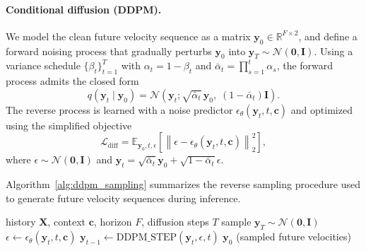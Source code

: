 \paragraph{Conditional diffusion (DDPM).}
We model the clean future velocity sequence as a matrix $\mathbf{y}_0 \in \mathbb{R}^{F\times 2}$, and define a forward noising process that gradually perturbs $\mathbf{y}_0$ into $\mathbf{y}_T \sim \mathcal{N}(\mathbf{0}, \mathbf{I})$.
Using a variance schedule $\{\beta_t\}_{t=1}^T$ with $\alpha_t=1-\beta_t$ and $\bar{\alpha}_t=\prod_{s=1}^t \alpha_s$, the forward process admits the closed form
\begin{equation}
  q(\mathbf{y}_t \mid \mathbf{y}_0)=\mathcal{N}\!\left(\mathbf{y}_t; \sqrt{\bar{\alpha}_t}\,\mathbf{y}_0,\; (1-\bar{\alpha}_t)\mathbf{I}\right).
  \label{eq:ddpm_forward}
\end{equation}
The reverse process is learned with a noise predictor $\epsilon_\theta(\mathbf{y}_t,t,\mathbf{c})$ and optimized using the simplified objective
\begin{equation}
  \mathcal{L}_{\mathrm{diff}} =
  \mathbb{E}_{\mathbf{y}_0,t,\epsilon}\left[\left\|\epsilon - \epsilon_\theta(\mathbf{y}_t,t,\mathbf{c})\right\|_2^2\right],
  \label{eq:ddpm_loss}
\end{equation}
where $\epsilon \sim \mathcal{N}(\mathbf{0},\mathbf{I})$ and $\mathbf{y}_t=\sqrt{\bar{\alpha}_t}\mathbf{y}_0+\sqrt{1-\bar{\alpha}_t}\epsilon$.

Algorithm~\ref{alg:ddpm_sampling} summarizes the reverse sampling procedure used to generate future velocity sequences during inference.

\begin{algorithm}[t]
  \caption{Reverse diffusion sampling (future velocities)}
  \label{alg:ddpm_sampling}
  \begin{algpseudocode}[1]
    \Require history $\mathbf{X}$, context $\mathbf{c}$, horizon $F$, diffusion steps $T$
    \State sample $\mathbf{y}_T \sim \mathcal{N}(\mathbf{0}, \mathbf{I})$
      \State $\epsilon \leftarrow \epsilon_\theta(\mathbf{y}_t, t, \mathbf{c})$
      \State $\mathbf{y}_{t-1} \leftarrow \mathrm{DDPM\_STEP}(\mathbf{y}_t, \epsilon, t)$
    \EndFor
    \State \Return $\mathbf{y}_0$ (sampled future velocities)
  \end{algpseudocode}
\end{algorithm}

